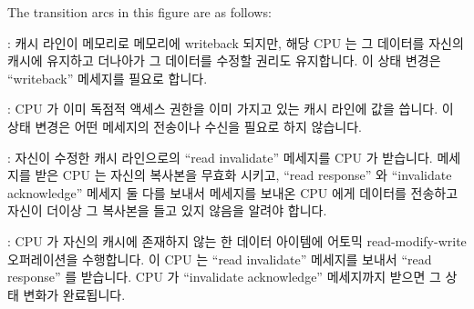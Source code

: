 The transition arcs in this figure are as follows:
\fi
\begin{description}[style=nextline]
\item	[상태 변화(a)]:
	캐시 라인이 메모리로 메모리에 writeback 되지만, 해당 CPU 는 그 데이터를
	자신의 캐시에 유지하고 더나아가 그 데이터를 수정할 권리도 유지합니다.
	이 상태 변경은 ``writeback'' 메세지를 필요로 합니다.
\item	[상태 변화 (b)]:
	CPU 가 이미 독점적 액세스 권한을 이미 가지고 있는 캐시 라인에 값을
	씁니다.
	이 상태 변경은 어떤 메세지의 전송이나 수신을 필요로 하지 않습니다.
\item	[상태 변화 (c)]:
	자신이 수정한 캐시 라인으로의 ``read invalidate'' 메세지를 CPU 가
	받습니다.
	메세지를 받은 CPU 는 자신의 복사본을 무효화 시키고, ``read response''
	와 ``invalidate acknowledge'' 메세지 둘 다를 보내서 메세지를 보내온 CPU
	에게 데이터를 전송하고 자신이 더이상 그 복사본을 들고 있지 않음을
	알려야 합니다.
\item	[상태 변화 (d)]:
	CPU 가 자신의 캐시에 존재하지 않는 한 데이터 아이템에 어토믹
	read-modify-write 오퍼레이션을 수행합니다.
	이 CPU 는 ``read invalidate'' 메세지를 보내서 ``read response'' 를
	받습니다.
	CPU 가 ``invalidate acknowledge'' 메세지까지 받으면 그 상태 변화가
	완료됩니다.
\iffalse


\end{description}
